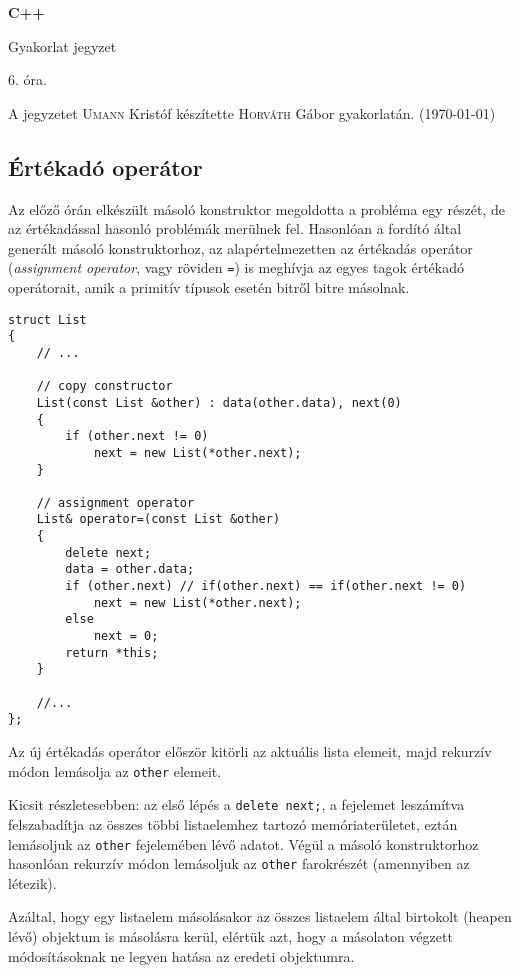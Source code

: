 \documentclass[a4paper,11.5pt,table]{article}
\begin{document}
	\setlength\parindent{0pt}
	\def\<{<\hspace{0mm}<}
	
	\theoremstyle{definition}
	\newtheorem{note}{Megjegyzés}[subsection]
	
	\begin{center}
		{\LARGE\textbf{C++}}
		
		{\Large Gyakorlat jegyzet}
		
		6. óra.
	\end{center}
	A jegyzetet \textsc{Umann} Kristóf készítette \textsc{Horváth} Gábor gyakorlatán. (\today)
	\subsection{Értékadó operátor}
  Az előző órán elkészült másoló konstruktor megoldotta a probléma egy részét, de az értékadással hasonló problémák merülnek fel. Hasonlóan a fordító által generált másoló konstruktorhoz, az alapértelmezetten az értékadás operátor (\textit{assignment operator}, vagy röviden \texttt{=}) is meghívja az egyes tagok értékadó operátorait, amik a primitív típusok esetén bitről bitre másolnak.
\begin{lstlisting}
struct List
{
	// ...
	
	// copy constructor
	List(const List &other) : data(other.data), next(0)
	{
		if (other.next != 0)
			next = new List(*other.next);
	}
	
	// assignment operator
	List& operator=(const List &other)
	{
		delete next;
		data = other.data;
		if (other.next) // if(other.next) == if(other.next != 0)
			next = new List(*other.next);
		else
			next = 0;
		return *this;
	}
	
	//...
};
\end{lstlisting}
	Az új értékadás operátor először kitörli az aktuális lista elemeit, majd rekurzív módon lemásolja az \texttt{other} elemeit.
	
  Kicsit részletesebben: az első lépés a \texttt{delete next;}, a fejelemet leszámítva felszabadítja az összes többi listaelemhez tartozó memóriaterületet, eztán lemásoljuk az \texttt{other} fejelemében lévő adatot. Végül a másoló konstruktorhoz hasonlóan rekurzív módon lemásoljuk az \texttt{other} farokrészét (amennyiben az létezik).
	
  Azáltal, hogy egy listaelem másolásakor az összes listaelem által birtokolt (heapen lévő) objektum is másolásra kerül, elértük azt, hogy a másolaton végzett módosításoknak ne legyen hatása az eredeti objektumra.
	\medskip
	
\end{document}
